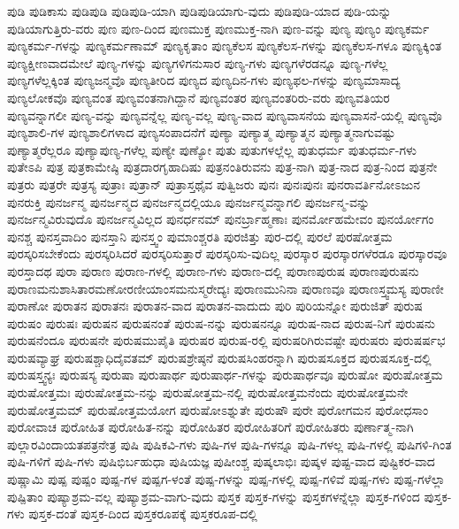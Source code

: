 {ಪುಡಿ
ಪುಡಿಕಾಸು
ಪುಡಿಪುಡಿ
ಪುಡಿಪುಡಿ-ಯಾಗಿ
ಪುಡಿಪುಡಿಯಾಗು-ವುದು
ಪುಡಿಪುಡಿ-ಯಾದ
ಪುಡಿ-ಯನ್ನು
ಪುಡಿಯಾಗುತ್ತಿರು-ವರು
ಪುಣ
ಪುಣ-ದಿಂದ
ಪುಣಮುಕ್ತ
ಪುಣಮುಕ್ತ-ನಾಗಿ
ಪುಣ-ವನ್ನು
ಪುಣ್ಯ
ಪುಣ್ಯಂ
ಪುಣ್ಯಕರ್ಮ
ಪುಣ್ಯಕರ್ಮ-ಗಳನ್ನು
ಪುಣ್ಯಕರ್ಮಣಾಮ್
ಪುಣ್ಯಕೃತಾಂ
ಪುಣ್ಯಕೆಲಸ
ಪುಣ್ಯಕೆಲಸ-ಗಳನ್ನು
ಪುಣ್ಯಕೆಲಸ-ಗಳೂ
ಪುಣ್ಯಕ್ಕಿಂತ
ಪುಣ್ಯಕ್ಷೀಣವಾದಮೇಲೆ
ಪುಣ್ಯ-ಗಳನ್ನು
ಪುಣ್ಯಗಳಿಗನುಸಾರ
ಪುಣ್ಯ-ಗಳು
ಪುಣ್ಯಗಳೆರಡನ್ನೂ
ಪುಣ್ಯ-ಗಳೆಲ್ಲ
ಪುಣ್ಯಗಳೆಲ್ಲಕ್ಕಿಂತ
ಪುಣ್ಯಜನ್ಮವೊ
ಪುಣ್ಯತೀರಿದ
ಪುಣ್ಯದ
ಪುಣ್ಯದಿನ-ಗಳು
ಪುಣ್ಯಫಲ-ಗಳನ್ನು
ಪುಣ್ಯಮಾಸಾದ್ಯ
ಪುಣ್ಯಲೋಕವೊ
ಪುಣ್ಯವಂತ
ಪುಣ್ಯವಂತನಾಗಿದ್ದಾನೆ
ಪುಣ್ಯವಂತರ
ಪುಣ್ಯವಂತರಿರು-ವರು
ಪುಣ್ಯವತಿಯರ
ಪುಣ್ಯವನ್ನಾಗಲೀ
ಪುಣ್ಯ-ವನ್ನು
ಪುಣ್ಯವನ್ನೆಲ್ಲ
ಪುಣ್ಯ-ವಲ್ಲ
ಪುಣ್ಯ-ವಾದ
ಪುಣ್ಯವಾಸನೆಯ
ಪುಣ್ಯವಾಸನೆ-ಯಲ್ಲಿ
ಪುಣ್ಯವೊ
ಪುಣ್ಯಶಾಲಿ-ಗಳ
ಪುಣ್ಯಶಾಲಿಗಳಾದ
ಪುಣ್ಯಸಂಪಾದನೆಗೆ
ಪುಣ್ಯಾ
ಪುಣ್ಯಾತ್ಮ
ಪುಣ್ಯಾತ್ಮನ
ಪುಣ್ಯಾತ್ಮನಾಗುವಷ್ಟು
ಪುಣ್ಯಾತ್ಮರೆಲ್ಲರೂ
ಪುಣ್ಯಾಪುಣ್ಯ-ಗಳೆಲ್ಲ
ಪುಣ್ಯೇ
ಪುಣ್ಯೋ
ಪುತು
ಪುತುಗಳಲ್ಲೆಲ್ಲ
ಪುತುಧರ್ಮ
ಪುತುಧರ್ಮ-ಗಳು
ಪುತೇಽಪಿ
ಪುತ್ರ
ಪುತ್ರಕಾಮೇಷ್ಠಿ
ಪುತ್ರದಾರಗೃಹಾದಿಷು
ಪುತ್ರನಂತಿರುವನು
ಪುತ್ರ-ನಾಗಿ
ಪುತ್ರ-ನಾದ
ಪುತ್ರ-ನಿಂದ
ಪುತ್ರನೇ
ಪುತ್ರರು
ಪುತ್ರರೇ
ಪುತ್ರಸ್ಯ
ಪುತ್ರಾಃ
ಪುತ್ರಾನ್
ಪುತ್ರಾಸ್ತಥೈವ
ಪುತ್ವಿಜರು
ಪುನಃ
ಪುನಃಪುನಃ
ಪುನರಾವರ್ತಿನೋಽಜುನ
ಪುನರುಕ್ತಿ
ಪುನರ್ಜನ್ಮ
ಪುನರ್ಜನ್ಮದ
ಪುನರ್ಜನ್ಮದಲ್ಲಿಯೂ
ಪುನರ್ಜನ್ಮವನ್ನಾಗಲಿ
ಪುನರ್ಜನ್ಮ-ವನ್ನು
ಪುನರ್ಜನ್ಮವಿರುವುದೊ
ಪುನರ್ಜನ್ಮವಿಲ್ಲದ
ಪುನರ್ಧನಮ್
ಪುನರ್ಬ್ರಾಹ್ಮಣಾಃ
ಪುನರ್ಮೋಹಮೇವಂ
ಪುನರ್ಯೋಗಂ
ಪುನಶ್ಚ
ಪುನಸ್ತವಾದಿಂ
ಪುನಸ್ತಾನಿ
ಪುನಸ್ತ್ವಂ
ಪುಮಾಂಶ್ಚರತಿ
ಪುರಜಿತ್ತು
ಪುರ-ದಲ್ಲಿ
ಪುರಲೆ
ಪುರಷೋತ್ತಮ
ಪುರಸ್ಕರಿಸಬೇಕೆಂದು
ಪುರಸ್ಕರಿಸಿದರೆ
ಪುರಸ್ಕರಿಸುತ್ತಾರೆ
ಪುರಸ್ಕರಿಸು-ವುದಿಲ್ಲ
ಪುರಸ್ಕಾರ
ಪುರಸ್ಕಾರಗಳೆರಡೂ
ಪುರಸ್ಕಾರವೂ
ಪುರಸ್ತಾದಥ
ಪುರಾ
ಪುರಾಣ
ಪುರಾಣ-ಗಳಲ್ಲಿ
ಪುರಾಣ-ಗಳು
ಪುರಾಣ-ದಲ್ಲಿ
ಪುರಾಣಪುರುಷ
ಪುರಾಣಪುರುಷನು
ಪುರಾಣಮನುಶಾಸಿತಾರಮಣೋರಣೀಯಾಂಸಮನುಸ್ಮರೇದ್ಯಃ
ಪುರಾಣಮುನಿನಾ
ಪುರಾಣವೂ
ಪುರಾಣಸ್ತ್ವಮಸ್ಯ
ಪುರಾಣೀ
ಪುರಾಣೋ
ಪುರಾತನ
ಪುರಾತನಃ
ಪುರಾತನ-ವಾದ
ಪುರಾತನ-ವಾದುದು
ಪುರಿ
ಪುರಿಯನ್ನೋ
ಪುರುಜಿತ್
ಪುರುಷ
ಪುರುಷಂ
ಪುರುಷಃ
ಪುರುಷನ
ಪುರುಷನಂತೆ
ಪುರುಷ-ನನ್ನು
ಪುರುಷನನ್ನೂ
ಪುರುಷ-ನಾದ
ಪುರುಷ-ನಿಗೆ
ಪುರುಷನು
ಪುರುಷನೆಂದೂ
ಪುರುಷನೇ
ಪುರುಷಮುಪೈತಿ
ಪುರುಷರ
ಪುರುಷ-ರಲ್ಲಿ
ಪುರುಷರಿಗಿರುವಷ್ಟೇ
ಪುರುಷರು
ಪುರುಷರ್ಷಭ
ಪುರುಷವ್ಯಾಘ್ರ
ಪುರುಷಶ್ಚಾಧಿದೈವತಮ್
ಪುರುಷಶ್ರೇಷ್ಠನೆ
ಪುರುಷಸಿಂಹರನ್ನಾಗಿ
ಪುರುಷಸೂಕ್ತದ
ಪುರುಷಸೂಕ್ತ-ದಲ್ಲಿ
ಪುರುಷಸ್ತ್ವನ್ಯಃ
ಪುರುಷಸ್ಯ
ಪುರುಷಾ
ಪುರುಷಾರ್ಥ
ಪುರುಷಾರ್ಥ-ಗಳನ್ನು
ಪುರುಷಾರ್ಥವೂ
ಪುರುಷೋ
ಪುರುಷೋತ್ತಮ
ಪುರುಷೋತ್ತಮಃ
ಪುರುಷೋತ್ತಮ-ನನ್ನು
ಪುರುಷೋತ್ತಮ-ನಲ್ಲಿ
ಪುರುಷೋತ್ತಮನೆಂದು
ಪುರುಷೋತ್ತಮನೇ
ಪುರುಷೋತ್ತಮಮ್
ಪುರುಷೋತ್ತಮಯೋಗ
ಪುರುಷೋಽಶ್ನುತೇ
ಪುರುಷೌ
ಪುರೇ
ಪುರೋಗಮನ
ಪುರೋಧಸಾಂ
ಪುರೋವಾಚ
ಪುರೋಹಿತ
ಪುರೋಹಿತ-ನನ್ನು
ಪುರೋಹಿತರ
ಪುರೋಹಿತರಿಗೆ
ಪುರೋಹಿತರು
ಪುರ್ಣಾತ್ಮ-ನಾಗಿ
ಪುಲ್ಲಾರವಿಂದಾಯತಪತ್ರನೇತ್ರ
ಪುಷಿ
ಪುಷಿಕವಿ-ಗಳು
ಪುಷಿ-ಗಳ
ಪುಷಿ-ಗಳನ್ನೂ
ಪುಷಿ-ಗಳಲ್ಲ
ಪುಷಿ-ಗಳಲ್ಲಿ
ಪುಷಿಗಳಿ-ಗಿಂತ
ಪುಷಿ-ಗಳಿಗೆ
ಪುಷಿ-ಗಳು
ಪುಷಿಭಿರ್ಬಹುಧಾ
ಪುಷಿಯಜ್ಞ
ಪುಷೀಂಶ್ಚ
ಪುಷ್ಕಲಾಭಿಃ
ಪುಷ್ಕಳ
ಪುಷ್ಟ-ವಾದ
ಪುಷ್ಟಿಕರ-ವಾದ
ಪುಷ್ಣಾಮಿ
ಪುಷ್ಪ
ಪುಷ್ಪಂ
ಪುಷ್ಪ-ಗಳ
ಪುಷ್ಪಗ-ಳಂತೆ
ಪುಷ್ಪ-ಗಳನ್ನು
ಪುಷ್ಪ-ಗಳಲ್ಲಿ
ಪುಷ್ಪ-ಗಳಿವೆ
ಪುಷ್ಪ-ಗಳು
ಪುಷ್ಪ-ಗಳೆಲ್ಲಾ
ಪುಷ್ಪಿತಾಂ
ಪುಷ್ಯಾಶ್ರಮ-ವಲ್ಲ
ಪುಷ್ಯಾಶ್ರಮ-ವಾಗು-ವುದು
ಪುಸ್ತಕ
ಪುಸ್ತಕ-ಗಳನ್ನು
ಪುಸ್ತಕಗಳನ್ನೆಲ್ಲಾ
ಪುಸ್ತಕ-ಗಳಿಂದ
ಪುಸ್ತಕ-ಗಳು
ಪುಸ್ತಕ-ದಂತೆ
ಪುಸ್ತಕ-ದಿಂದ
ಪುಸ್ತಕರೂಪಕ್ಕೆ
ಪುಸ್ತಕರೂಪ-ದಲ್ಲಿ
}
